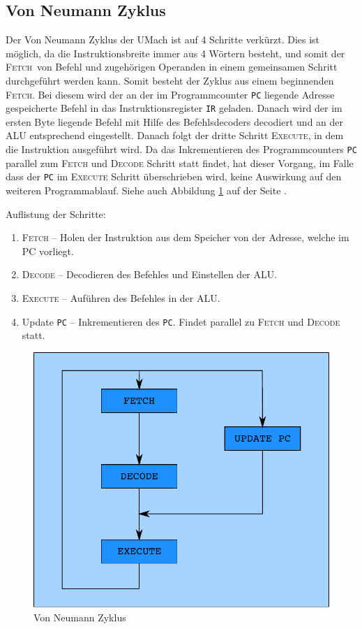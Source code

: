\subsection[Neumann Zyklus]{Von Neumann Zyklus}
\label{subsec:Neumann-Zyklus}

Der Von Neumann Zyklus der UMach ist auf 4 Schritte verkürzt. Dies ist möglich,
da die Instruktionsbreite immer aus 4 Wörtern besteht, und somit der 
\glqq\textsc{Fetch}\grqq\ von 
Befehl und zugehörigen Operanden in einem gemeinsamen Schritt durchgeführt
werden kann. Somit besteht der Zyklus aus einem beginnenden \textsc{Fetch}. Bei
diesem wird der an der im Programmcounter \texttt{PC} liegende Adresse
gespeicherte Befehl in das Instruktionsregister \texttt{IR} geladen. Danach
wird der im ersten Byte liegende Befehl mit Hilfe des Befehlsdecoders decodiert
und an der ALU entsprechend eingestellt. Danach folgt der dritte Schritt
\textsc{Execute}, in dem die Instruktion ausgeführt wird. Da das Inkrementieren
des Programmcounters \texttt{PC} parallel zum \textsc{Fetch} und \textsc{Decode}
Schritt statt findet, hat dieser Vorgang, im Falle dass der \texttt{PC} im
\textsc{Execute} Schritt überschrieben wird, keine Auswirkung auf den weiteren
Programmablauf. 
Siehe auch Abbildung \ref{fig:Neumann-Zyklus} auf der Seite
\pageref{fig:Neumann-Zyklus}.

Auflistung der Schritte:

\begin{enumerate}
 \item \textsc{Fetch} --
       Holen der Instruktion aus dem Speicher von der Adresse, welche im PC
       vorliegt.
 \item \textsc{Decode} --
       Decodieren des Befehles und Einstellen der ALU.
 \item \textsc{Execute} --
       Auführen des Befehles in der ALU.
 \item Update \texttt{PC} --
       Inkrementieren des \texttt{PC}. Findet parallel zu \textsc{Fetch} und
       \textsc{Decode} statt.
\end{enumerate}

\begin{figure}[h!tp]
 \centering
 \includegraphics{./img/zyklus.pdf}
 \caption{Von Neumann Zyklus }
 \label{fig:Neumann-Zyklus}
\end{figure}

